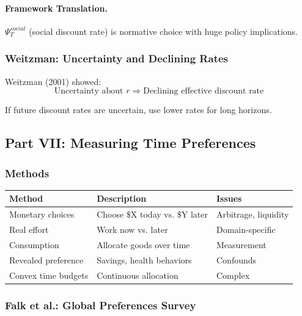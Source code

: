\paragraph{Framework Translation.}
$\Psi_T^{social}$ (social discount rate) is normative choice with huge policy implications.

\subsubsection{Weitzman: Uncertainty and Declining Rates}

Weitzman (2001) showed:
\begin{equation}
\text{Uncertainty about } r \Rightarrow \text{Declining effective discount rate}
\end{equation}

If future discount rates are uncertain, use lower rates for long horizons.

\subsection{Part VII: Measuring Time Preferences}

\subsubsection{Methods}

\begin{center}
\renewcommand{\arraystretch}{1.3}
\begin{tabular}{|l|l|l|}
\hline
\textbf{Method} & \textbf{Description} & \textbf{Issues} \\
\hline
Monetary choices & Choose \$X today vs. \$Y later & Arbitrage, liquidity \\
Real effort & Work now vs. later & Domain-specific \\
Consumption & Allocate goods over time & Measurement \\
Revealed preference & Savings, health behaviors & Confounds \\
Convex time budgets & Continuous allocation & Complex \\
\hline
\end{tabular}
\end{center}

\subsubsection{Falk et al.: Global Preferences Survey}

